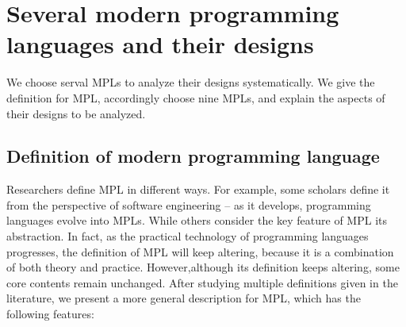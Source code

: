 \section{Several modern programming languages and their designs}

We choose serval MPLs to analyze their designs systematically.
We give the definition for MPL, accordingly choose nine MPLs,
and explain the aspects of their designs to be analyzed.



\subsection{Definition of modern programming language}

Researchers define MPL in different ways.
For example, some scholars define it from the perspective of software
engineering – as it develops, programming languages evolve into MPLs\cite{ModernProgrammingLanguagesSoftwareEnginerring}.
While others consider the key feature of MPL its abstraction\cite{ModernProgrammingLanguagesAbstraction}.
In fact, as the practical technology of programming languages progresses,
the definition of MPL will keep altering, because it is a combination
of both theory and practice.
However,although its definition keeps altering,
some core contents remain unchanged.
After studying multiple definitions given in the literature, we present a
more general description for MPL, which has the following features:


